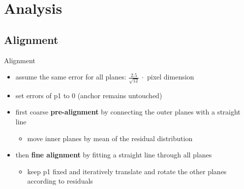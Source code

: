 \section{Analysis}
\subsection{Alignment}
\begin{frame}{Alignment}


	\begin{itemize}\itemfill
		\item<1-> assume the same error for all planes: $\frac{2.5}{\sqrt{12}}\,\cdot$ pixel dimension
		\item<1-> set errors of p1 to 0 (anchor \ra remains untouched)
		\item<1-> first coarse \textbf{pre-alignment} by connecting the outer planes with a straight line
		\begin{itemize}
			\item<1-> move inner planes by mean of the residual distribution\vspace*{5pt}
		\end{itemize}
		\item<2->then \textbf{fine alignment} by fitting a straight line through all planes
		\begin{itemize}
			\item<2-> keep p1 fixed and iteratively translate and rotate the other planes according to residuals 
		\end{itemize}
	\end{itemize}
	
\end{frame}
